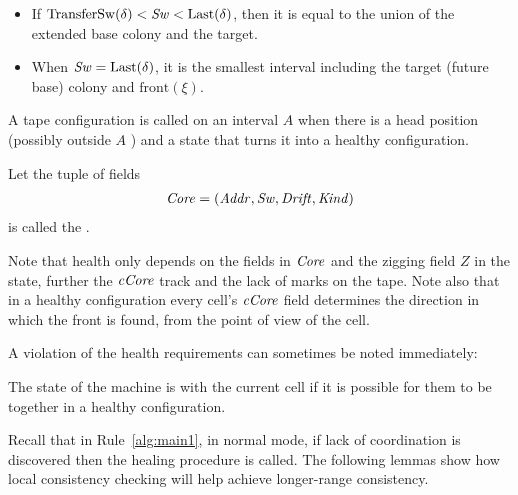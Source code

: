 \documentclass[12pt]{memoir}
\newcommand{\fld}[1]{\ensuremath{\textit{#1\/}}}
\newcommand{\Z}{Z}
\newcommand{\Addr}{\fld{Addr}}
\newcommand{\Core}{\fld{Core}}
\newcommand{\cCore}{\fld{cCore}}
\newcommand{\Drift}{\fld{Drift}}
\newcommand{\Kind}{\fld{Kind}}
\newcommand{\Sweep}{\fld{Sw}}
\newcommand{\front}{\mathrm{front}}
\newcommand{\Last}{\mathrm{Last}}
\newcommand{\TransferSw}{\mathrm{TransferSw}}
\begin{document}
\begin{definition}
\begin{description}
\begin{itemize}
        \item If \( \TransferSw(\delta) < \Sweep < \Last(\delta) \),
              then it is equal to the union of the extended base colony and the target.

        \item When \( \Sweep = \Last(\delta) \), it is the smallest interval including the target
              (future  base) colony and \( \front(\xi) \).
        \end{itemize}

   \end{description}

A tape configuration is called  on an interval \( A \)
when there is a head position (possibly outside \( A \) ) and a 
state that turns it into a healthy configuration.
 \end{definition}

 \begin{definition}
Let the tuple of fields
\begin{align*}
   \Core =(\Addr, \Sweep, \Drift, \Kind)
 \end{align*}
is called the .   
 \end{definition}

Note that health only depends on the fields in \( \Core \) and
the zigging field \( \Z \) in the state, further the  \( \cCore \) track
and the lack of marks on the tape.
Note also that in a healthy configuration every cell's \( \cCore \) field
determines the direction in which the front is found, from the point of
view of the cell.

A violation of the health requirements can sometimes be noted immediately:

\begin{definition}[Coordination] \label{def:coordinated}
   The state of the machine is  with the current cell
   if it is possible for them to be together in a healthy configuration.
\end{definition}

Recall that in Rule~\ref{alg:main1}, in normal mode,
if lack of coordination is discovered then the healing procedure is called.
The following lemmas show 
how local consistency checking will help achieve longer-range consistency.
\end{document}
